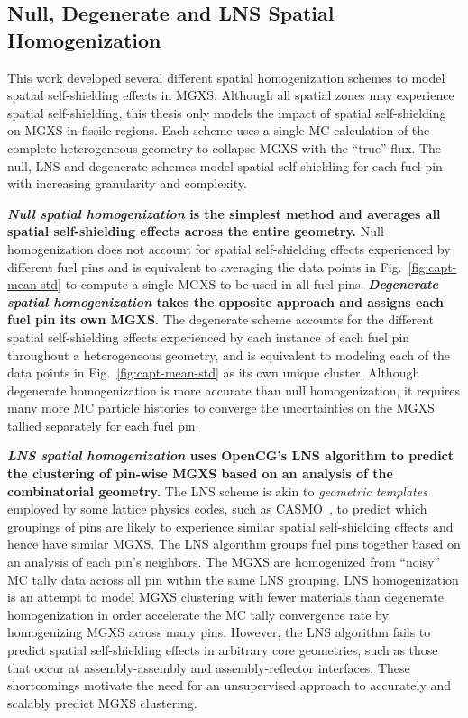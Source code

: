 \documentclass[12pt,twoside]{mitthesis-exec}
\begin{document}
\subsection*{Null, Degenerate and LNS Spatial Homogenization}

This work developed several different spatial homogenization schemes to model spatial self-shielding effects in MGXS. Although all spatial zones may experience spatial self-shielding, this thesis only models the impact of spatial self-shielding on MGXS in fissile regions. Each scheme uses a single MC calculation of the complete heterogeneous geometry to collapse MGXS with the ``true'' flux. The null, LNS and degenerate schemes model spatial self-shielding for each fuel pin with increasing granularity and complexity.

\textbf{\textit{Null spatial homogenization} is the simplest method and averages all spatial self-shielding effects across the entire geometry.} Null homogenization does not account for spatial self-shielding effects experienced by different fuel pins and is equivalent to averaging the data points in Fig.~\ref{fig:capt-mean-std} to compute a single MGXS to be used in all fuel pins. \textbf{\textit{Degenerate spatial homogenization} takes the opposite approach and assigns each fuel pin its own MGXS.} The degenerate scheme accounts for the different spatial self-shielding effects experienced by each instance of each fuel pin throughout a heterogeneous geometry, and is equivalent to modeling each of the data points in Fig.~\ref{fig:capt-mean-std} as its own unique cluster. Although degenerate homogenization is more accurate than null homogenization, it requires many more MC particle histories to converge the uncertainties on the MGXS tallied separately for each fuel pin.

\textbf{\textit{LNS spatial homogenization} uses OpenCG's LNS algorithm to predict the clustering of pin-wise MGXS based on an analysis of the combinatorial geometry.} The LNS scheme is akin to \textit{geometric templates} employed by some lattice physics codes, such as CASMO~\cite{rhodes2006casmo}, to predict which groupings of pins are likely to experience similar spatial self-shielding effects and hence have similar MGXS. The LNS algorithm groups fuel pins together based on an analysis of each pin's neighbors. The MGXS are homogenized from ``noisy'' MC tally data across all pin within the same LNS grouping. LNS homogenization is an attempt to model MGXS clustering with fewer materials than degenerate homogenization in order accelerate the MC tally convergence rate by homogenizing MGXS across many pins. However, the LNS algorithm fails to predict spatial self-shielding effects in arbitrary core geometries, such as those that occur at assembly-assembly and assembly-reflector interfaces. These shortcomings motivate the need for an unsupervised approach to accurately and scalably predict MGXS clustering.
\end{document}

